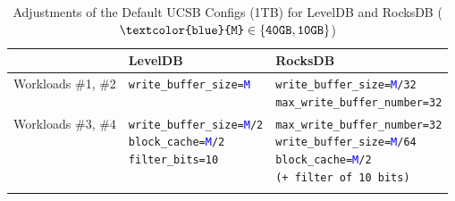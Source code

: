 \begin{table}[h]
	\centering
	\caption[Adjustments of the Default UCSB Configs (1TB) for LevelDB and RocksDB]{Adjustments of the Default UCSB Configs (1TB) for LevelDB and RocksDB ($\texttt{\textcolor{blue}{M}} \in \{\texttt{40GB}, \texttt{10GB}\}$)}
	\label{tab:leveldb_rocksdb_settings}
	\vspace*{5mm}
	\begin{tabular}{@{}lll@{}}
		\toprule \addlinespace[1mm]
		& LevelDB                                                                                                                                                                                                                                                                                                         & RocksDB                                                                                                                                                                                                                                                                                                                                                                                                      \\ \midrule \addlinespace[1mm]
		Workloads \#1, \#2 & \texttt{write\_buffer\_size=\textcolor{blue}{M}}                                                                                                                                                                                                                            & \makecell[l]{\texttt{write\_buffer\_size=\textcolor{blue}{M}/32}\\ \texttt{max\_write\_buffer\_number=32}}                                                                                                                                                                                             \\ \addlinespace[1mm]
		Workloads \#3, \#4 & \makecell[l]{\texttt{write\_buffer\_size=\textcolor{blue}{M}/2}\\ \texttt{block\_cache=\textcolor{blue}{M}/2}\\ \texttt{filter\_bits=10}} & \makecell[l]{\texttt{max\_write\_buffer\_number=32}\\ \texttt{write\_buffer\_size=\textcolor{blue}{M}/64}\\ \texttt{block\_cache=\textcolor{blue}{M}/2}\\ \texttt{(+ filter of 10 bits)}} \\ \addlinespace[1mm] \bottomrule
	\end{tabular}
\end{table}

